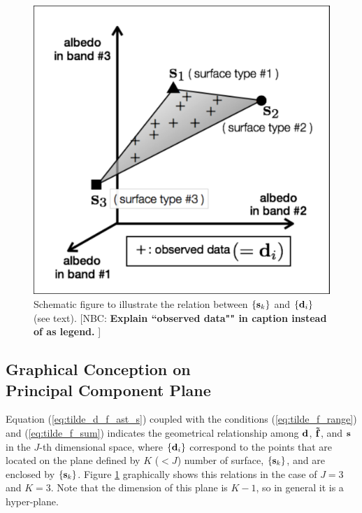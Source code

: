 \documentclass[iop,numberedappendix,apj,]{emulateapj}
\def\fast{\tilde f}
\def\memoYF#1{\color{red}[YF: {\bf #1}]\color{black}}
\def\memoNBC#1{\color{blue}[NBC: {\bf #1}]\color{black}}
\begin{document}
\begin{figure}[b!]
    \begin{center}
\includegraphics[width=\hsize]{schematics.pdf}
    \end{center}
    \caption{Schematic figure to illustrate the relation between $\{{\bf s}_k\} $ and $\{{\bf d}_i\} $ (see text). \memoNBC{Explain ``observed data"" in caption instead of as legend. }}
\label{fig:schematic}
\end{figure}


\subsection{Graphical Conception on \\Principal Component Plane}
\label{ss:PCplane}


Equation (\ref{eq:tilde_d_f_ast_s}) coupled with the conditions (\ref{eq:tilde_f_range}) and (\ref{eq:tilde_f_sum}) indicates the geometrical relationship among ${\bf d}$, ${\bf \fast }$, and ${\bf s}$ in the $J$-th dimensional space, where $\{{\bf d}_i\}$ correspond to the points that are located on the plane defined by $K$ ($<J$) number of surface, $\{{\bf s}_k\} $, and are enclosed by $\{{\bf s}_k \}$. 
Figure \ref{fig:schematic} graphically shows this relations in the case of $J=3$ and $K=3$. 
Note that the dimension of this plane is $K-1$, so in general it is a hyper-plane.  
\end{document}

